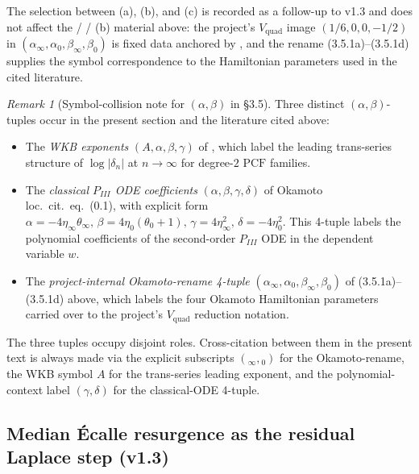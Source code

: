 \documentclass[11pt,reqno]{amsart}
\theoremstyle{plain}
\theoremstyle{definition}
\theoremstyle{remark}
\newtheorem{remark}[theorem]{Remark}
\newcommand{\PCF}{\mathrm{PCF}}
\newcommand{\Vquad}{V_{\mathrm{quad}}}
\newcommand{\dn}{\delta_{n}}
\begin{document}
The selection between (a), (b), and (c) is recorded as a
follow-up to v1.3 and does not affect the  /
 / (b) material above:
the project's $\Vquad$ image $(1/6, 0, 0, -1/2)$ in
$(\alpha_\infty, \alpha_0, \beta_\infty, \beta_0)$ is fixed
data anchored by \cite{iwasaki1991from, ohyama2006studies},
and the rename (3.5.1a)--(3.5.1d) supplies the symbol
correspondence to the Hamiltonian parameters used in the cited
literature.

\begin{remark}[Symbol-collision note for $(\alpha, \beta)$ in
\S 3.5]
\label{rem:alpha-beta-tuples}
Three distinct $(\alpha, \beta)$-tuples occur in the present
section and the literature cited above:
\begin{itemize}
\item The {\em WKB exponents} $(A, \alpha, \beta, \gamma)$ of
, which label the leading trans-series
structure of $\log|\dn|$ at $n \to \infty$ for degree-$2$
$\PCF$ families.
\item The {\em classical $P_{III}$ ODE coefficients}
$(\alpha, \beta, \gamma, \delta)$ of Okamoto loc.\ cit.\
eq.\ (0.1), with explicit form
$\alpha = -4 \eta_\infty \theta_\infty,\,
\beta = 4 \eta_0 (\theta_0 + 1),\,
\gamma = 4 \eta_\infty^{2},\,
\delta = -4 \eta_0^{2}$. This 4-tuple labels the polynomial
coefficients of the second-order $P_{III}$ ODE in the
dependent variable $w$.
\item The {\em project-internal Okamoto-rename 4-tuple}
$(\alpha_\infty, \alpha_0, \beta_\infty, \beta_0)$ of
(3.5.1a)--(3.5.1d) above, which labels the four Okamoto
Hamiltonian parameters carried over to the project's
$\Vquad$ reduction notation.
\end{itemize}
The three tuples occupy disjoint roles. Cross-citation between
them in the present text is always made via the explicit
subscripts $({}_\infty, {}_0)$ for the Okamoto-rename, the WKB
symbol $A$ for the trans-series leading exponent, and the
polynomial-context label $(\gamma, \delta)$ for the
classical-ODE 4-tuple.
\end{remark}

\subsection{Median \'Ecalle resurgence as the residual
Laplace step (v1.3)}
\label{ssec:h4-median}
\end{document}
